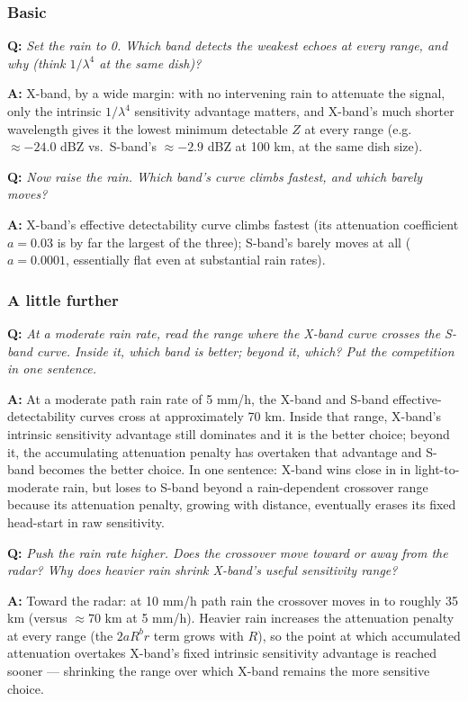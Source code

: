 \documentclass[11pt]{article}
\newenvironment{qa}[1]{\par\noindent\textbf{\color{qgray}Q: }\emph{#1}\par\noindent\textbf{A: }}{\par\vspace{6pt}}
\newcommand{\tier}[1]{\subsubsection*{#1}}
\begin{document}
\tier{Basic}
\begin{qa}{Set the rain to 0. Which band detects the weakest echoes at every range, and why (think $1/\lambda^4$ at the same dish)?}
X-band, by a wide margin: with no intervening rain to attenuate the signal, only the intrinsic $1/\lambda^4$ sensitivity advantage matters, and X-band's much shorter wavelength gives it the lowest minimum detectable $Z$ at every range (e.g.\ $\approx-24.0$ dBZ vs.\ S-band's $\approx-2.9$ dBZ at 100 km, at the same dish size).
\end{qa}
\begin{qa}{Now raise the rain. Which band's curve climbs fastest, and which barely moves?}
X-band's effective detectability curve climbs fastest (its attenuation coefficient $a=0.03$ is by far the largest of the three); S-band's barely moves at all ($a=0.0001$, essentially flat even at substantial rain rates).
\end{qa}

\tier{A little further}
\begin{qa}{At a moderate rain rate, read the range where the X-band curve crosses the S-band curve. Inside it, which band is better; beyond it, which? Put the competition in one sentence.}
At a moderate path rain rate of 5 mm/h, the X-band and S-band effective-detectability curves cross at approximately 70 km. Inside that range, X-band's intrinsic sensitivity advantage still dominates and it is the better choice; beyond it, the accumulating attenuation penalty has overtaken that advantage and S-band becomes the better choice. In one sentence: X-band wins close in in light-to-moderate rain, but loses to S-band beyond a rain-dependent crossover range because its attenuation penalty, growing with distance, eventually erases its fixed head-start in raw sensitivity.
\end{qa}
\begin{qa}{Push the rain rate higher. Does the crossover move toward or away from the radar? Why does heavier rain shrink X-band's useful sensitivity range?}
Toward the radar: at 10 mm/h path rain the crossover moves in to roughly 35 km (versus $\approx$70 km at 5 mm/h). Heavier rain increases the attenuation penalty at every range (the $2aR^br$ term grows with $R$), so the point at which accumulated attenuation overtakes X-band's fixed intrinsic sensitivity advantage is reached sooner --- shrinking the range over which X-band remains the more sensitive choice.
\end{qa}
\end{document}
